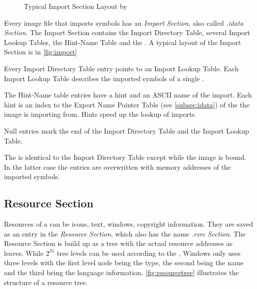 \begin{figure}
\caption{Typical Import Section Layout by }
\label{fig:import} 
\end{figure}

Every image file that imports symbols has an \emph{Import Section}, also called \emph{.idata Section}.
The Import Section contains the Import Directory Table, several Import Lookup Tables, the Hint-Name Table and the \IAT{}. A typical layout of the Import Section is in \autoref{fig:import}

Every Import Directory Table entry points to an Import Lookup Table. Each Import Lookup Table describes the imported symbols of a single \DLL{}.

The Hint-Name table entries have a hint and an ASCII name of the import. Each hint is an index to the Export Name Pointer Table (see \autoref{subsec:idata}) of the \DLL{} the image is importing from. Hints speed up the lookup of imports.

Null entries mark the end of the Import Directory Table and the Import Lookup Table.

The \IAT{} is identical to the Import Directory Table except while the image is bound. In the latter case the \IAT{} entries are overwritten with memory addresses of the imported symbols.

\subsection*{Resource Section}

Resources of a \PE{} can be \ia{} icons, text, windows, copyright information. They are saved as an entry in the \emph{Resource Section}, which also has the name \emph{.rsrc Section}. The Resource Section is build up as a tree with the actual resource addresses as leaves. While \(2^{31}\) tree levels can be used according to the \PECOFF{} \cite[]{pespec}, Windows only uses three levels with the first level node being the type, the second being the name and the third being the language information. \autoref{fig:resourcetree} illustrates the structure of a resource tree.

